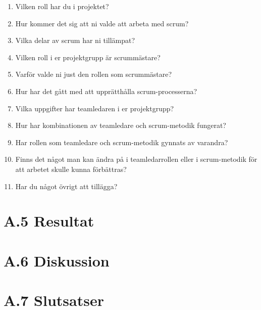 \begin{enumerate}

\item Vilken roll har du i projektet?

\item Hur kommer det sig att ni valde att arbeta med scrum?

\item Vilka delar av scrum har ni tillämpat?

\item Vilken roll i er projektgrupp är scrummästare?

\item Varför valde ni just den rollen som scrummästare?

\item Hur har det gått med att upprätthålla scrum-processerna?

\item Vilka uppgifter har teamledaren i er projektgrupp?

\item Hur har kombinationen av teamledare och scrum-metodik fungerat?

\item Har rollen som teamledare och scrum-metodik gynnats av varandra?

\item Finns det något man kan ändra på i teamledarrollen eller i scrum-metodik för att arbetet skulle kunna förbättras?

\item Har du något övrigt att tillägga?

\end{enumerate}

\section{A.5 Resultat}

\section{A.6 Diskussion}

\section{A.7 Slutsatser}

